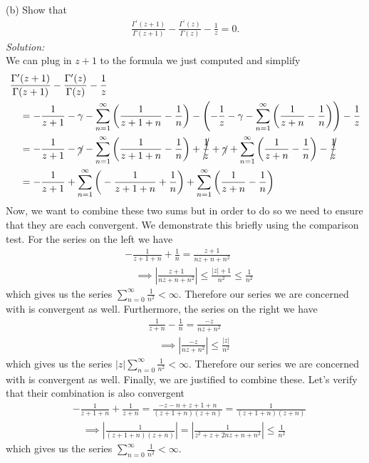 \documentclass[10pt]{amsart}
\theoremstyle{nonumberplain}
\begin{document}
\begin{enumerate}[label={\bf {\arabic*}:}]
\noindent
(b) Show that
\begin{align}
\frac {\Gamma^\prime(z + 1)} {\Gamma(z + 1)} - \frac {\Gamma^\prime(z)} {\Gamma(z)} - \frac 1 z = 0.
\label{eq:gamma_thing}
\end{align}
\textit{Solution:} \\
We can plug in $z + 1$ to the formula we just computed and simplify
\begin{align*}
&\frac {\Gamma^\prime(z + 1)} {\Gamma(z + 1)} - \frac {\Gamma^\prime(z)} {\Gamma(z)} - \frac 1 z \\
	& \quad = - \frac 1 {z + 1} - \gamma - \sum_{n=1}^\infty \bigg( \frac 1 {z + 1 + n} - \frac 1 n \bigg) - \left(- \frac 1 z - \gamma - \sum_{n=1}^\infty \bigg( \frac 1 {z + n} - \frac 1 n \bigg) \right) - \frac 1 z \\
	& \quad = - \frac 1 {z + 1} - \cancel{\gamma} - \sum_{n=1}^\infty \bigg( \frac 1 {z + 1 + n} - \frac 1 n \bigg) + \cancel{\frac 1 z} + \cancel{\gamma} + \sum_{n=1}^\infty \bigg( \frac 1 {z + n} - \frac 1 n \bigg) - \cancel{\frac 1 z} \\
	& \quad = - \frac 1 {z + 1} + \sum_{n=1}^\infty \bigg( - \frac 1 {z + 1 + n} + \frac 1 n \bigg) + \sum_{n=1}^\infty \bigg( \frac 1 {z + n} - \frac 1 n \bigg) \\
\end{align*}
Now, we want to combine these two sums but in order to do so we need to ensure that they are each convergent.
We demonstrate this briefly using the comparison test.
For the series on the left we have
\begin{align*}
& - \frac 1 {z + 1 + n} + \frac 1 n = \frac {z + 1} {nz + n + n^2} \\
& \quad \implies \left| \frac {z + 1} {nz + n + n^2}\right| \leq \frac {|z| + 1} {n^2} \leq \frac 1 {n^2}
\end{align*}
which gives us the series $\sum_{n=0}^\infty \frac 1 {n^2} < \infty$.
Therefore our series we are concerned with is convergent as well.
Furthermore, the series on the right we have
\begin{align*}
& \frac 1 {z + n} - \frac 1 n = \frac {- z} {nz + n^2} \\
& \quad \implies \left| \frac {-z} {nz + n^2}\right| \leq \frac {|z|} {n^2}
\end{align*}
which gives us the series $|z| \sum_{n=0}^\infty \frac 1 {n^2} < \infty$.
Therefore our series we are concerned with is convergent as well.
Finally, we are justified to combine these.
Let's verify that their combination is also convergent
\begin{align*}
& - \frac 1 {z + 1 + n} + \frac 1 {z + n} = \frac {- z - n + z + 1 + n} {(z + 1 + n)(z + n)} = \frac {1} {(z + 1 + n)(z + n)} \\
& \quad \implies \left| \frac {1} {(z + 1 + n)(z + n)} \right| = \left| \frac {1} {z^2 + z + 2nz + n + n^2} \right| \leq \frac 1 {n^2}
\end{align*}
which gives us the series $\sum_{n=0}^\infty \frac 1 {n^2} < \infty$.


\end{enumerate}
\end{document}
